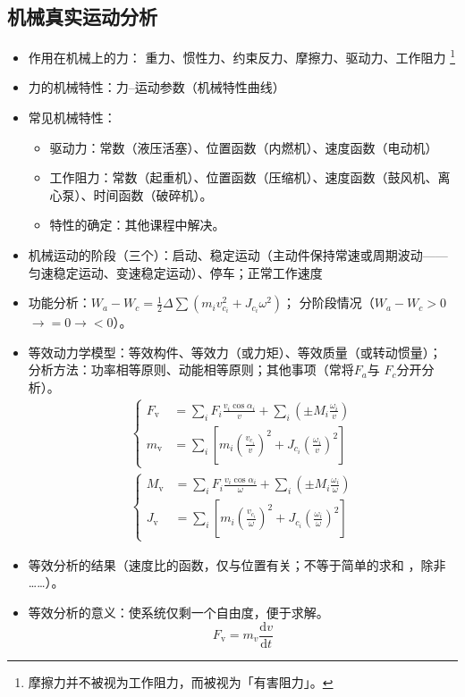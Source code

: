 \documentclass[12pt,a4paper]{article}
\newcommand{\tightlist}{\setlength{\parskip}{0pt}\setlength{\itemsep}{0pt}}
\newcommand{\hint}[1]{\textsf{（#1）}}
\newcommand{\minor}[1]{{\color{gray} #1}}
\newcommand{\then}{$\to$}
\begin{document}
\subsection{机械真实运动分析}
\begin{itemize}\tightlist
    \item 作用在机械上的力：\minor{重力、惯性力、约束反力、摩擦力、}驱动力、工作阻力
    \footnote{摩擦力并不被视为工作阻力，而被视为「有害阻力」。}
    \item 力的机械特性：力--运动参数\hint{机械特性曲线}
    \item 常见机械特性：
    \begin{itemize}\tightlist
        \item 驱动力：常数\hint{液压活塞}、位置函数\hint{内燃机}、速度函数\hint{电动机}
        \item 工作阻力：常数\hint{起重机}、位置函数\hint{压缩机}、速度函数\hint%
        {鼓风机、离心泵}、时间函数\hint{破碎机}。
        \item \minor{特性的确定：其他课程中解决。}
    \end{itemize}
    \item 机械运动的阶段\hint{三个}：启动、稳定运动\hint{主动件保持常速或周期波动——
    匀速稳定运动、变速稳定运动}、停车；正常工作速度
    \item 功能分析：$W_a-W_c=\frac12\Delta\sum(m_iv_{c_i}^2+J_{c_i}\omega^2)$；
    分阶段情况\hint{$W_a-W_c>0$\then$=0$\then$<0$}。
    \item 等效动力学模型：等效构件、等效力\hint{或力矩}、等效质量\hint{或转动惯量}；
    分析方法：功率相等原则、动能相等原则；其他事项\hint{常将$F_a$与
    $F_c$分开分析}。
    \begin{gather}
    \left\{
    \begin{aligned}
    F_\text{v}&=\sum_iF_i\frac{v_i\cos\alpha_i}{v}+\sum_i\left(\pm M_i\frac%
    {\omega_i}{v}\right)\\
    m_\text{v}&=\sum_i\left[m_i\left(\frac{v_{c_i}}{v}\right)^2+J_{c_i}\left(
    \frac{\omega_i}{v}\right)^2\right]
    \end{aligned}\right.\\\left\{
    \begin{aligned}
    M_\text{v}&=\sum_iF_i\frac{v_i\cos\alpha_i}{\omega}+\sum_i\left(\pm M_i
    \frac{\omega_i}{\omega}\right)\\
    J_\text{v}&=\sum_i\left[m_i\left(\frac{v_{c_i}}{\omega}\right)^2+J_{c_i}\left(
    \frac{\omega_i}{\omega}\right)^2\right]
    \end{aligned}\right.
    \end{gather}
    \item 等效分析的结果\hint{速度比的函数，仅与位置有关；不等于简单的求和\minor{，除非
    ……}}。
    \item 等效分析的意义：使系统仅剩一个自由度，便于求解。
    \begin{equation}
    F_\text{v}=m_v\frac{\mathrm{d}v}{\mathrm{d}t}
    \end{equation}
\end{itemize}
\end{document}
